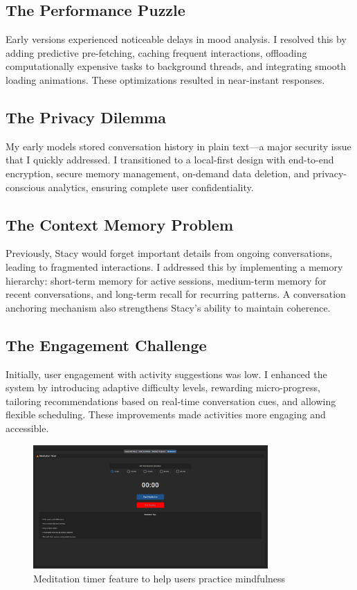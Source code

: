 \documentclass[12pt]{article}
\begin{document}
\subsection{The Performance Puzzle}
Early versions experienced noticeable delays in mood analysis. I resolved this by adding predictive pre-fetching, caching frequent interactions, offloading computationally expensive tasks to background threads, and integrating smooth loading animations. These optimizations resulted in near-instant responses.

\subsection{The Privacy Dilemma}
My early models stored conversation history in plain text—a major security issue that I quickly addressed. I transitioned to a local-first design with end-to-end encryption, secure memory management, on-demand data deletion, and privacy-conscious analytics, ensuring complete user confidentiality.

\subsection{The Context Memory Problem}
Previously, Stacy would forget important details from ongoing conversations, leading to fragmented interactions. I addressed this by implementing a memory hierarchy: short-term memory for active sessions, medium-term memory for recent conversations, and long-term recall for recurring patterns. A conversation anchoring mechanism also strengthens Stacy's ability to maintain coherence.

\subsection{The Engagement Challenge}
Initially, user engagement with activity suggestions was low. I enhanced the system by introducing adaptive difficulty levels, rewarding micro-progress, tailoring recommendations based on real-time conversation cues, and allowing flexible scheduling. These improvements made activities more engaging and accessible.

\begin{figure}[H]
  \centering
  \includegraphics[width=0.8\textwidth]{../images/Meditation.png}
  \caption{Meditation timer feature to help users practice mindfulness}
\end{figure}
\end{document}
